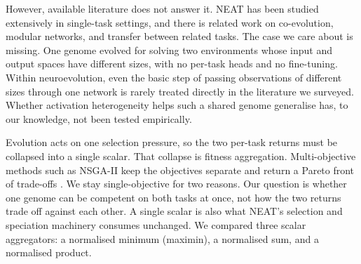 \documentclass[12pt]{article}
\begin{document}
% 

However, available literature does not answer it.
NEAT has been studied extensively in single-task settings, and there is related work on co-evolution, modular networks, and transfer between related tasks.
The case we care about is missing. One genome evolved for solving two environments whose input and output spaces have different sizes, with no per-task heads and no fine-tuning.
Within neuroevolution, even the basic step of passing observations of different sizes through one network is rarely treated directly in the literature we surveyed.
Whether activation heterogeneity helps such a shared genome generalise has, to our knowledge, not been tested empirically.

Evolution acts on one selection pressure, so the two per-task returns must be collapsed into a single scalar. That collapse is fitness aggregation.
Multi-objective methods such as NSGA-II keep the objectives separate and return a Pareto front of trade-offs \parencite{deb_fast_2002}.
We stay single-objective for two reasons. Our question is whether one genome can be competent on both tasks at once, not how the two returns trade off against each other. A single scalar is also what NEAT's selection and speciation machinery consumes unchanged.
We compared three scalar aggregators: a normalised minimum (maximin), a normalised sum, and a normalised product.

\end{document}
